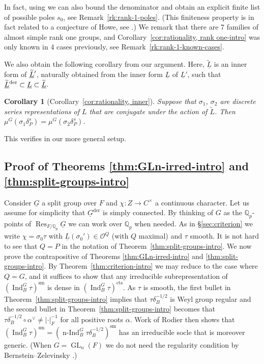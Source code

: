 \documentclass[a4paper]{amsart}
\numberwithin{equation}{section}
\newtheorem{cor}[thm]{Corollary}
\theoremstyle{remark}
\theoremstyle{definition}
\DeclareMathOperator{\Ind}{Ind}
\DeclareMathOperator{\nInd}{n-Ind}
\DeclareMathOperator{\Res}{Res}
\newcommand{\Q}{\mathbb{Q}}
\DeclareMathOperator{\GL}{GL}
\newcommand{\sm}{\mathrm{sm}}
\newcommand{\alggrp}[1]{\underline{#1}}
\newcommand{\der}{\mathrm{der}}
\newcommand{\cts}{\mathrm{cts}}
\newcommand{\lowprime}[1][\prime]{
  \mathchoice
    {\raisebox{-0.7ex}{$\scriptstyle #1$}}
    {\raisebox{-0.7ex}{$\scriptstyle #1$}}
    {\raisebox{-0.7ex}{$\scriptstyle #1$}}
    {\raisebox{-0.3ex}{$\scriptscriptstyle #1$}}
}
\begin{document}
In fact, using \cite[Theorem 8.1]{MR1070599} we can also bound the denominator and obtain an explicit finite list of possible poles $s_0$, see Remark~\ref{rk:rank-1-poles}.
(This finiteness property is in fact related to a conjecture of Howe, see \cite{MR806844}.)
We remark that there are 7 families of almost simple rank one groups, and Corollary~\ref{cor:rationality, rank one-intro} was only known in 4 cases previously, see Remark~\ref{rk:rank-1-known-cases}.

We also obtain the following corollary from our argument.
Here, $\widetilde{\alggrp{L}}$ is an inner form of $\widetilde{\alggrp{L}}^{\lowprime}$, naturally obtained from the inner form $\alggrp L$ of $\alggrp{L}'$, such that $\widetilde{\alggrp{L}}^{\lowprime[\der]} \subset \alggrp{L} \subset \widetilde{\alggrp{L}}$.

\begin{cor}[Corollary~\ref{cor:rationality, inner}]\label{cor:rationality, inner-intro}
  Suppose that $\sigma_1$, $\sigma_2$ are discrete series representations of $L$ that are conjugate under the action of $\widetilde{L}$.
  Then $\mu^G(\sigma_1\delta_{P}^{s}) = \mu^G(\sigma_2\delta_{P}^{s})$.
\end{cor}

This verifies \cite[Working Hypothesis 1.1]{MR3194161} in our more general setup.

\subsection{Proof of Theorems \ref{thm:GLn-irred-intro} and \ref{thm:split-groups-intro}}
\label{sec:proof-intro3}

Consider $\alggrp G$ a split group over $F$ and $\chi \colon Z \to C^\times$ a continuous character.
Let us assume for simplicity that $\alggrp G^\der$ is simply connected.
By thinking of $G$ as the $\Q_p$-points of $\Res_{F/\Q_p} \alggrp G$ we can work over $\Q_p$ when needed.
As in \S\ref{sec:criterion} we write $\chi = \sigma_0\tau$ with $\underline L(\sigma_0') \in \mathcal O^Q$ (with $Q$ maximal) and $\tau$ smooth.
It is not hard to see that $Q = P$ in the notation of Theorem~\ref{thm:split-groups-intro}.
We now prove the contrapositive of Theorems \ref{thm:GLn-irred-intro} and \ref{thm:split-groups-intro}.
By Theorem~\ref{thm:criterion-intro} we may reduce to the case where $Q = G$, and it suffices to show that any irreducible subrepresentation of $(\Ind_{B}^{G} \tau)^\sm$ is dense in $(\Ind_{B}^{G} \tau)^\cts$.
As $\tau$ is smooth, the first bullet in Theorem~\ref{thm:split-groups-intro} implies that $\tau\delta_B^{-1/2}$ is Weyl group regular and the second bullet in Theorem~\ref{thm:split-groups-intro} becomes that $\tau\delta_B^{-1/2} \circ \alpha^\vee \ne \lvert \cdot\rvert_F^{-1}$ for all positive roots $\alpha$.
Work of Rodier \cite{MR644842} then shows that $(\Ind_{B}^{G} \tau)^\sm = (\nInd_{B}^{G} \tau\delta_B^{-1/2})^\sm$ has an irreducible socle that is moreover generic.
(When $G = \GL_n(F)$ we do not need the regularity condition by Bernstein--Zelevinsky \cite{MR0579172}.)
\end{document}
